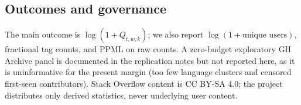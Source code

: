 \subsection{Outcomes and governance}

The main outcome is $\log(1+Q_{t,w,k})$; we also report
$\log(1+\text{unique users})$, fractional tag counts, and PPML on
raw counts. A zero-budget exploratory GH Archive panel is
documented in the replication notes but not reported here, as it
is uninformative for the present margin (too few language
clusters and censored first-seen contributors). Stack Overflow content is CC BY-SA 4.0; the
project distributes only derived statistics, never underlying
user content.
